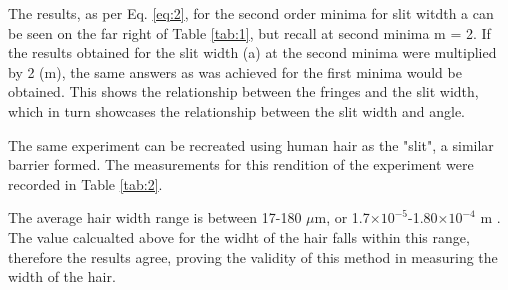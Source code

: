 \documentclass[12pt]{article}
\begin{document}
The results, as per Eq. \ref{eq:2}, for the second order minima for slit witdth a can be seen on the far right of Table \ref{tab:1}, but recall at second minima m = 2. If the results obtained for the slit width (a) at the second minima
were multiplied by 2 (m), the same answers as was achieved for the first minima would be obtained. This shows the relationship between the fringes and the slit width, which in turn showcases the relationship between the slit width and angle.

The same experiment can be recreated using human hair as the "slit", a similar barrier formed. The measurements for this rendition of the experiment were recorded in Table \ref{tab:2}.

\begin{table}[H]
    \caption{Table of results with human hair as a slit.}
    \label{tab:2}
\end{table}

The average hair width range is between 17-180 $\mu$m, or 1.7$\times 10^{-5}$-1.80$\times 10^{-4}$ m \cite{hairwidth}. The value calcualted above for the widht of the hair falls within this range, therefore the results
agree, proving the validity of this method in measuring the width of the hair.
\end{document}
